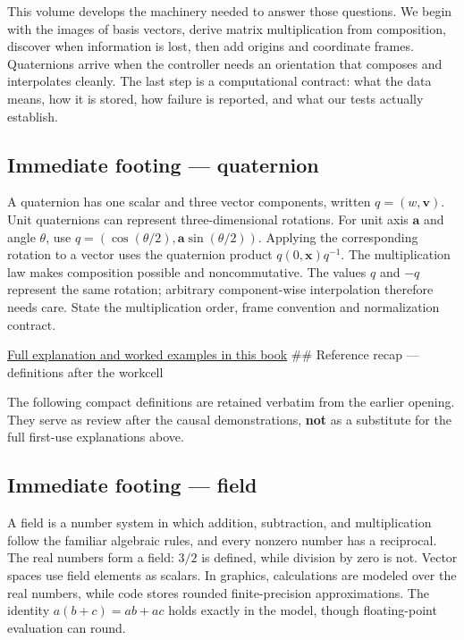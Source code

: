 This volume develops the machinery needed to answer those questions. We begin with the images of basis vectors, derive matrix multiplication from composition, discover when information is lost, then add origins and coordinate frames. Quaternions arrive when the controller needs an orientation that composes and interpolates cleanly. The last step is a computational contract: what the data means, how it is stored, how failure is reported, and what our tests actually establish.

\subsection{Immediate footing --- quaternion}\label{01-foundations-i-ch018-immediate-footing-quaternion}

A quaternion has one scalar and three vector components, written \(q=(w,\mathbf v)\). Unit quaternions can represent three-dimensional rotations. For unit axis \(\mathbf a\) and angle \(\theta\), use \(q=(\cos(\theta/2),\mathbf a\sin(\theta/2))\). Applying the corresponding rotation to a vector uses the quaternion product \(q(0,\mathbf x)q^{-1}\). The multiplication law makes composition possible and noncommutative. The values \(q\) and \(-q\) represent the same rotation; arbitrary component-wise interpolation therefore needs care. State the multiplication order, frame convention and normalization contract.

\hyperref[01-foundations-i-ch019-orientation-needs-a-state-that-can-be-composed]{Full explanation and worked examples in this book} \#\# Reference recap --- definitions after the workcell

The following compact definitions are retained verbatim from the earlier opening. They serve as review after the causal demonstrations, \textbf{not} as a substitute for the full first-use explanations above.

\subsection{Immediate footing --- field}\label{01-foundations-i-ch018-immediate-footing-field}

A field is a number system in which addition, subtraction, and multiplication follow the familiar algebraic rules, and every nonzero number has a reciprocal. The real numbers form a field: \(3/2\) is defined, while division by zero is not. Vector spaces use field elements as scalars. In graphics, calculations are modeled over the real numbers, while code stores rounded finite-precision approximations. The identity \(a(b+c)=ab+ac\) holds exactly in the model, though floating-point evaluation can round.

